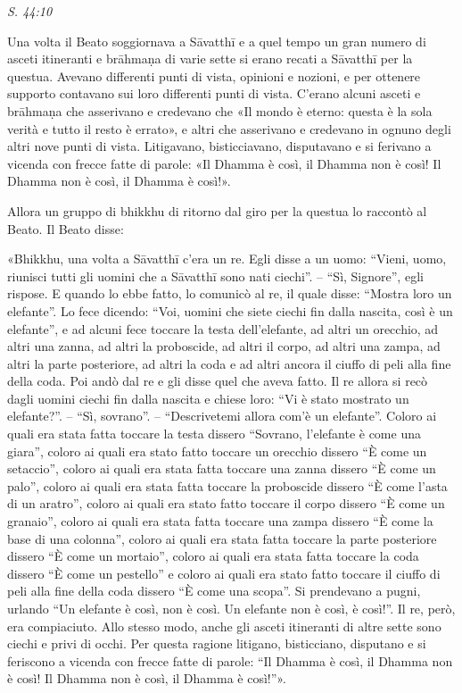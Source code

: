 \emph{S. 44:10}


Una volta il Beato soggiornava a Sāvatthī e a quel tempo un gran numero
di asceti itineranti e brāhmaṇa di varie sette si erano recati a
Sāvatthī per la questua. Avevano differenti punti di vista, opinioni e
nozioni, e per ottenere supporto contavano sui loro differenti punti di
vista. C’erano alcuni asceti e brāhmaṇa che asserivano e credevano che
«Il mondo è eterno: questa è la sola verità e tutto il resto è errato»,
e altri che asserivano e credevano in ognuno degli altri nove punti di
vista. Litigavano, bisticciavano, disputavano e si ferivano a vicenda
con frecce fatte di parole: «Il Dhamma è così, il Dhamma non è così! Il
Dhamma non è così, il Dhamma è così!».


Allora un gruppo di bhikkhu di ritorno dal giro per la questua lo
raccontò al Beato. Il Beato disse:


«Bhikkhu, una volta a Sāvatthī c’era un re. Egli disse a un uomo:
“Vieni, uomo, riunisci tutti gli uomini che a Sāvatthī sono nati
ciechi”. – “Sì, Signore”, egli rispose. E quando lo ebbe fatto, lo
comunicò al re, il quale disse: “Mostra loro un elefante”. Lo fece
dicendo: “Voi, uomini che siete ciechi fin dalla nascita, così è un
elefante”, e ad alcuni fece toccare la testa dell’elefante, ad altri un
orecchio, ad altri una zanna, ad altri la proboscide, ad altri il corpo,
ad altri una zampa, ad altri la parte posteriore, ad altri la coda e ad
altri ancora il ciuffo di peli alla fine della coda. Poi andò dal re e
gli disse quel che aveva fatto. Il re allora si recò dagli uomini ciechi
fin dalla nascita e chiese loro: “Vi è stato mostrato un elefante?”. –
“Sì, sovrano”. – “Descrivetemi allora com’è un elefante”. Coloro ai
quali era stata fatta toccare la testa dissero “Sovrano, l’elefante è
come una giara”, coloro ai quali era stato fatto toccare un orecchio
dissero “È come un setaccio”, coloro ai quali era stata fatta toccare
una zanna dissero “È come un palo”, coloro ai quali era stata fatta
toccare la proboscide dissero “È come l’asta di un aratro”, coloro ai
quali era stato fatto toccare il corpo dissero “È come un granaio”,
coloro ai quali era stata fatta toccare una zampa dissero “È come la
base di una colonna”, coloro ai quali era stata fatta toccare la parte
posteriore dissero “È come un mortaio”, coloro ai quali era stata fatta
toccare la coda dissero “È come un pestello” e coloro ai quali era stato
fatto toccare il ciuffo di peli alla fine della coda dissero “È come una
scopa”. Si prendevano a pugni, urlando “Un elefante è così, non è così.
Un elefante non è così, è così!”. Il re, però, era compiaciuto. Allo
stesso modo, anche gli asceti itineranti di altre sette sono ciechi e
privi di occhi. Per questa ragione litigano, bisticciano, disputano e si
feriscono a vicenda con frecce fatte di parole: “Il Dhamma è così, il
Dhamma non è così! Il Dhamma non è così, il Dhamma è così!”».


